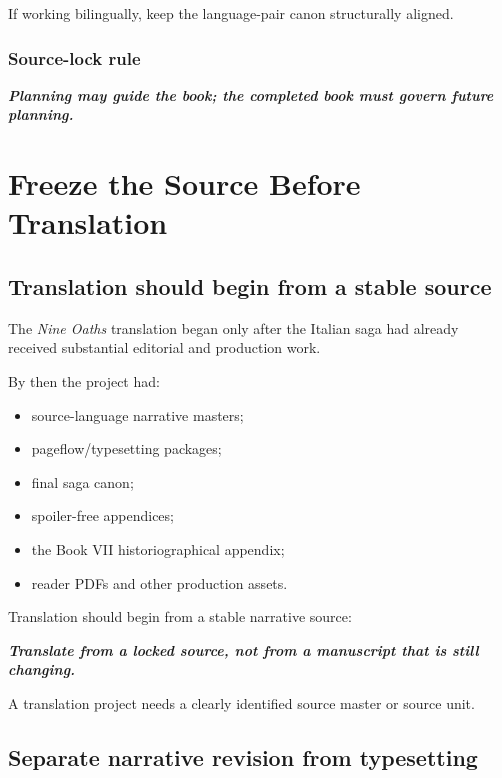 \documentclass[11pt,oneside,openany]{book}
\renewenvironment{quote}{\begin{insightbox}\itshape}{\end{insightbox}}
\providecommand{\tightlist}{%
  \setlength{\itemsep}{0pt}\setlength{\parskip}{0pt}}
\begin{document}
If working bilingually, keep the language-pair canon structurally aligned.

\section{Source-lock rule}\label{source-lock-rule}

\begin{quote}
\textbf{Planning may guide the book; the completed book must govern future planning.}
\end{quote}

\part{Freeze the Source Before Translation}

\chapter{Translation should begin from a stable source}\label{translation-should-begin-from-a-stable-source}

The \emph{Nine Oaths} translation began only after the Italian saga had already received substantial editorial and production work.

By then the project had:

\begin{itemize}
\tightlist
\item
  source-language narrative masters;
\item
  pageflow/typesetting packages;
\item
  final saga canon;
\item
  spoiler-free appendices;
\item
  the Book VII historiographical appendix;
\item
  reader PDFs and other production assets.
\end{itemize}

Translation should begin from a stable narrative source:

\begin{quote}
\textbf{Translate from a locked source, not from a manuscript that is still changing.}
\end{quote}

A translation project needs a clearly identified source master or source unit.

\chapter{Separate narrative revision from typesetting}
\end{document}
